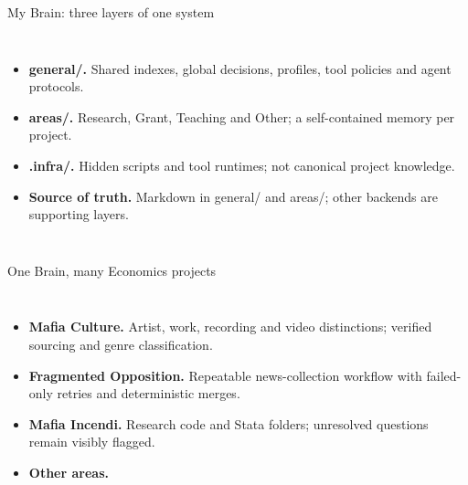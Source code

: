 \begin{frame}{My Brain: three layers of one system}
\begin{columns}[c,onlytextwidth]
\begin{itemize}\setlength{\itemsep}{.48em}\small
\item \textbf{general/.} Shared indexes, global decisions, profiles, tool policies and agent protocols.
\item \textbf{areas/.} Research, Grant, Teaching and Other; a self-contained memory per project.
\item \textbf{.infra/.} Hidden scripts and tool runtimes; not canonical project knowledge.
\item \textbf{Source of truth.} Markdown in general/ and areas/; other backends are supporting layers.
\end{itemize}
\end{columns}
\end{frame}

\begin{frame}{One Brain, many Economics projects}
\begin{columns}[c,onlytextwidth]
\begin{itemize}\setlength{\itemsep}{.48em}\small
\item \textbf{Mafia Culture.} Artist, work, recording and video distinctions; verified sourcing and genre classification.
\item \textbf{Fragmented Opposition.} Repeatable news-collection workflow with failed-only retries and deterministic merges.
\item \textbf{Mafia Incendi.} Research code and Stata folders; unresolved questions remain visibly flagged.
\item \textbf{Other areas.} 
\end{itemize}
\end{columns}
\medskip
{}
\end{frame}

